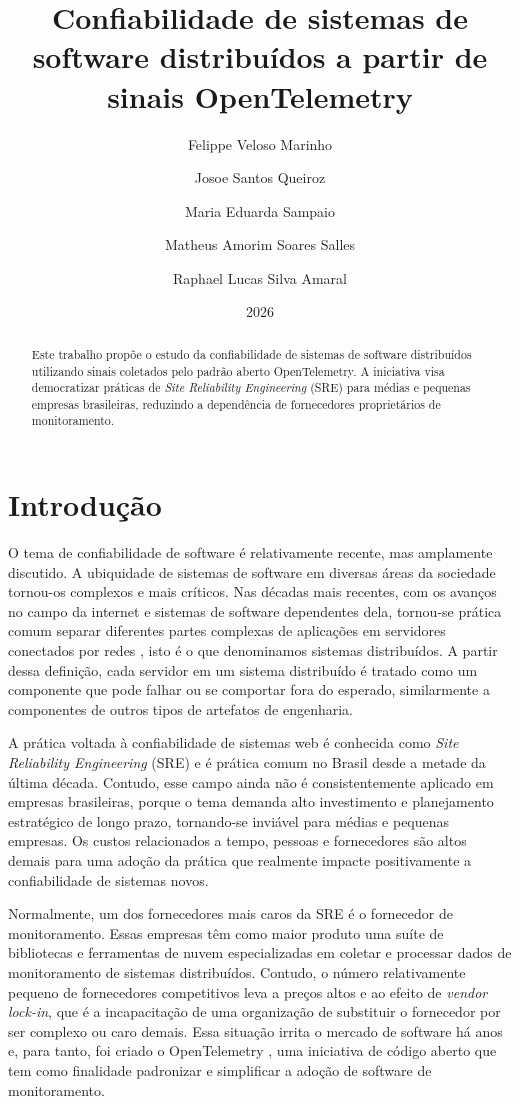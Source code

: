 \documentclass[10pt, twocolumn, a4paper]{article}
\title{\textbf{Confiabilidade de sistemas de software distribuídos a partir de sinais OpenTelemetry}}
\author{Felippe Veloso Marinho\and Josoe Santos Queiroz \and Maria Eduarda Sampaio \and Matheus Amorim Soares Salles \and Raphael Lucas Silva Amaral}
\date{2026}
\begin{document}
\maketitle

\begin{abstract}
Este trabalho propõe o estudo da confiabilidade de sistemas de software distribuídos utilizando sinais coletados pelo padrão aberto OpenTelemetry. A iniciativa visa democratizar práticas de \textit{Site Reliability Engineering} (SRE) para médias e pequenas empresas brasileiras, reduzindo a dependência de fornecedores proprietários de monitoramento.
\end{abstract}

\section{Introdução}

O tema de confiabilidade de software é relativamente recente, mas amplamente discutido. A ubiquidade de sistemas de software em diversas áreas da sociedade tornou-os complexos e mais críticos. Nas décadas mais recentes, com os avanços no campo da internet e sistemas de software dependentes dela, tornou-se prática comum separar diferentes partes complexas de aplicações em servidores conectados por redes \cite{fowler2002patterns}, isto é o que denominamos sistemas distribuídos. A partir dessa definição, cada servidor em um sistema distribuído é tratado como um componente que pode falhar ou se comportar fora do esperado, similarmente a componentes de outros tipos de artefatos de engenharia.

A prática voltada à confiabilidade de sistemas web é conhecida como \textit{Site Reliability Engineering} (SRE) \cite{google_sre} e é prática comum no Brasil desde a metade da última década. Contudo, esse campo ainda não é consistentemente aplicado em empresas brasileiras, porque o tema demanda alto investimento e planejamento estratégico de longo prazo, tornando-se inviável para médias e pequenas empresas. Os custos relacionados a tempo, pessoas e fornecedores são altos demais para uma adoção da prática que realmente impacte positivamente a confiabilidade de sistemas novos.

Normalmente, um dos fornecedores mais caros da SRE é o fornecedor de monitoramento. Essas empresas têm como maior produto uma suíte de bibliotecas e ferramentas de nuvem especializadas em coletar e processar dados de monitoramento de sistemas distribuídos. Contudo, o número relativamente pequeno de fornecedores competitivos leva a preços altos e ao efeito de \textit{vendor lock-in}, que é a incapacitação de uma organização de substituir o fornecedor por ser complexo ou caro demais. Essa situação irrita o mercado de software há anos e, para tanto, foi criado o OpenTelemetry \cite{otel_site}, uma iniciativa de código aberto que tem como finalidade padronizar e simplificar a adoção de software de monitoramento.
\end{document}
